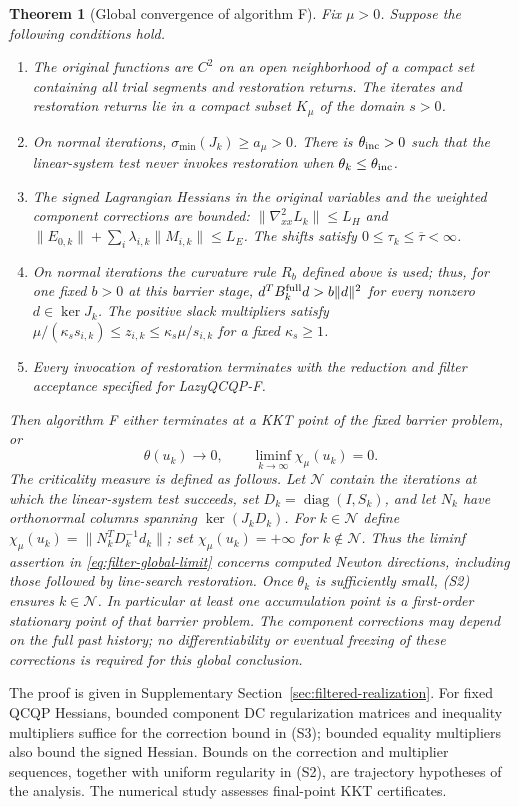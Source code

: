 \documentclass[pdflatex,sn-mathphys-num]{sn-jnl}
\theoremstyle{thmstyleone}
\newtheorem{theorem}{Theorem}[section]
\theoremstyle{thmstylethree}
\newcounter{algorithm}
\newcommand{\diag}{\operatorname{diag}}
\begin{document}
\begin{theorem}[Global convergence of algorithm F]
\label{thm:filtered-global}
Fix $\mu>0$. Suppose the following conditions hold.
\begin{enumerate}[label=(S\arabic*),leftmargin=2.8em]
\item The original functions are $C^2$ on an open neighborhood of a
compact set containing all trial segments and restoration returns.
The iterates and restoration returns lie in a compact subset
$K_\mu$ of the domain $s>0$.
\item On normal iterations,
$\sigma_{\min}(J_k)\geq a_\mu>0$.
There is $\theta_{\rm inc}>0$ such that the linear-system
test never invokes restoration when
$\theta_k\leq\theta_{\rm inc}$.
\item The signed Lagrangian Hessians in the original variables and the weighted
component corrections are bounded:
$\|\nabla^2_{xx}L_k\|\leq L_H$ and
$\|E_{0,k}\|+\sum_i\lambda_{i,k}\|M_{i,k}\|\leq L_E$.
The shifts satisfy $0\leq\tau_k\leq\overline\tau<\infty$.
\item On normal iterations the curvature rule $R_b$ defined above is used;
thus, for one fixed $b>0$ at this barrier stage,
$d^TB_k^{\rm full}d>b\|d\|^2$ for every nonzero $d\in\ker J_k$.
The positive slack multipliers satisfy
$\mu/(\kappa_s s_{i,k})\leq z_{i,k}
\leq\kappa_s\mu/s_{i,k}$ for a fixed $\kappa_s\geq1$.
\item Every invocation of restoration terminates with the reduction
and filter acceptance specified for LazyQCQP-F.
\end{enumerate}
Then algorithm F either terminates at a KKT point of the fixed
barrier problem, or
\begin{equation}
 \theta(u_k)\longrightarrow0,\qquad
 \liminf_{k\to\infty}\chi_\mu(u_k)=0 .
 \label{eq:filter-global-limit}
\end{equation}
The criticality measure is defined as follows. Let $\mathcal N$
contain the iterations at which the linear-system test
succeeds, set $D_k=\diag(I,S_k)$, and let $N_k$ have orthonormal
columns spanning $\ker(J_kD_k)$. For $k\in\mathcal N$ define
$\chi_\mu(u_k)=\|N_k^TD_k^{-1}d_k\|$; set
$\chi_\mu(u_k)=+\infty$ for $k\notin\mathcal N$.
Thus the liminf assertion in \eqref{eq:filter-global-limit}
concerns computed Newton directions, including those followed by
line-search restoration. Once $\theta_k$ is sufficiently small,
(S2) ensures $k\in\mathcal N$.
In particular at least one accumulation point is a first-order
stationary point of that barrier problem.
The component corrections may depend on the full past history;
no differentiability or eventual freezing of these corrections is
required for this global conclusion.
\end{theorem}
The proof is given in Supplementary Section~\ref{sec:filtered-realization}.
For fixed QCQP Hessians, bounded component DC regularization matrices and inequality multipliers
suffice for the correction bound in (S3); bounded equality multipliers also
bound the signed Hessian. Bounds on the correction and multiplier sequences, together with uniform
regularity in (S2), are trajectory hypotheses of the analysis. The numerical study
assesses final-point KKT certificates.
\end{document}
